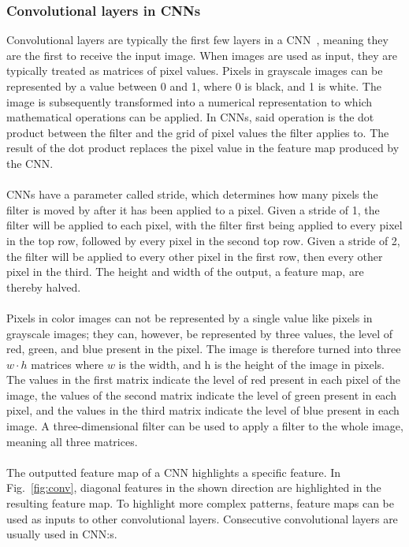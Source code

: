 \subsubsection{Convolutional layers in CNNs} 
Convolutional layers are typically the first few layers in a CNN~\cite{cnnforklarning}, meaning they are the first to receive the input image. When images are used as input, they are typically treated as matrices of pixel values. Pixels in grayscale images can be represented by a value between 0 and 1, where 0 is black, and 1 is white. The image is subsequently transformed into a numerical representation to which mathematical operations can be applied. In CNNs, said operation is the dot product between the filter and the grid of pixel values the filter applies to. The result of the dot product replaces the pixel value in the feature map produced by the CNN.
\\ \\
CNNs have a parameter called stride, which determines how many pixels the filter is moved by after it has been applied to a pixel. Given a stride of 1, the filter will be applied to each pixel, with the filter first being applied to every pixel in the top row, followed by every pixel in the second top row. Given a stride of 2, the filter will be applied to every other pixel in the first row, then every other pixel in the third. The height and width of the output, a feature map, are thereby halved.
\\ \\
Pixels in color images can not be represented by a single value like pixels in grayscale images; they can, however, be represented by three values, the level of red, green, and blue present in the pixel. The image is therefore turned into three $w\cdot h$ matrices where $w$ is the width, and h is the height of the image in pixels. The values in the first matrix indicate the level of red present in each pixel of the image, the values of the second matrix indicate the level of green present in each pixel, and the values in the third matrix indicate the level of blue present in each image. A three-dimensional filter can be used to apply a filter to the whole image, meaning all three matrices. 
\\ \\
The outputted feature map of a CNN highlights a specific feature. In Fig.~\ref{fig:conv}, diagonal features in the shown direction are highlighted in the resulting feature map. To highlight more complex patterns, feature maps can be used as inputs to other convolutional layers. Consecutive convolutional layers are usually used in CNN:s.


